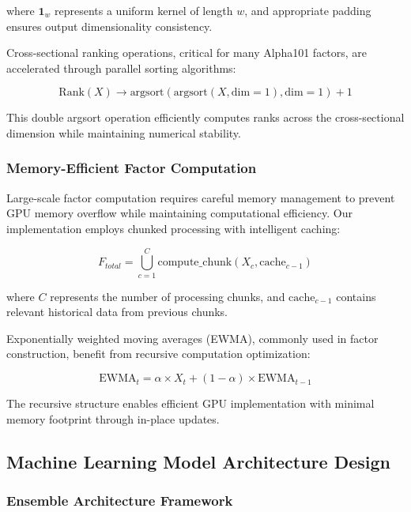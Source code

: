 \documentclass[conference]{IEEEtran}
\begin{document}
where $\mathbf{1}_w$ represents a uniform kernel of length $w$, and appropriate padding ensures output dimensionality consistency.

Cross-sectional ranking operations, critical for many Alpha101 factors, are accelerated through parallel sorting algorithms:

\begin{equation}
\text{Rank}(X) \rightarrow \text{argsort}(\text{argsort}(X, \text{dim}=1), \text{dim}=1) + 1
\end{equation}

This double argsort operation efficiently computes ranks across the cross-sectional dimension while maintaining numerical stability.

\subsubsection{Memory-Efficient Factor Computation}

Large-scale factor computation requires careful memory management to prevent GPU memory overflow while maintaining computational efficiency. Our implementation employs chunked processing with intelligent caching:

\begin{equation}
F_{total} = \bigcup_{c=1}^C \text{compute\_chunk}(X_c, \text{cache}_{c-1})
\end{equation}

where $C$ represents the number of processing chunks, and $\text{cache}_{c-1}$ contains relevant historical data from previous chunks.

Exponentially weighted moving averages (EWMA), commonly used in factor construction, benefit from recursive computation optimization:

\begin{equation}
\text{EWMA}_t = \alpha \times X_t + (1-\alpha) \times \text{EWMA}_{t-1}
\end{equation}

The recursive structure enables efficient GPU implementation with minimal memory footprint through in-place updates.

\subsection{Machine Learning Model Architecture Design}

\subsubsection{Ensemble Architecture Framework}
\end{document}
